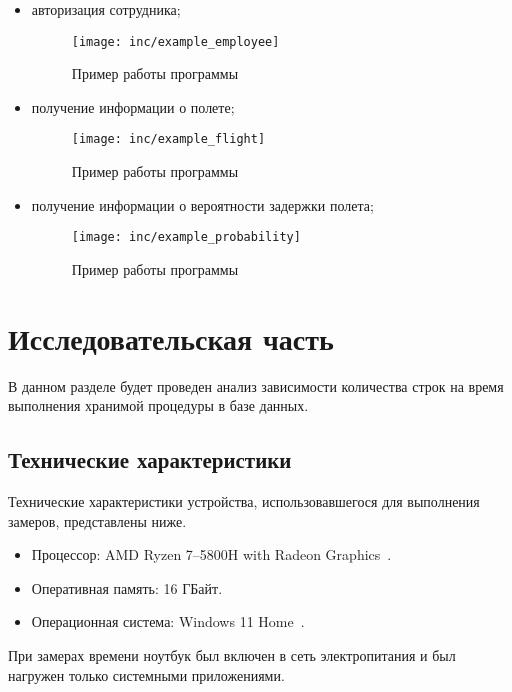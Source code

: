\begin{itemize}
    \item авторизация сотрудника;
    \begin{figure}[H]
        \centering
        \texttt{[image: inc/example\_employee]}
        \caption{Пример работы программы}
        \label{fig:example_employee}
    \end{figure}

    \item получение информации о полете;
    \begin{figure}[H]
        \centering
        \texttt{[image: inc/example\_flight]}
        \caption{Пример работы программы}
        \label{fig:example_flight}
    \end{figure}

    \item получение информации о вероятности задержки полета;
    \begin{figure}[H]
        \centering
        \texttt{[image: inc/example\_probability]}
        \caption{Пример работы программы}
        \label{fig:example_probability}
    \end{figure}
\end{itemize}


\chapter{Исследовательская часть}

В данном разделе будет проведен анализ зависимости количества строк на время выполнения хранимой процедуры в базе данных.

\section{Технические характеристики}

Технические характеристики устройства, использовавшегося для выполнения замеров, представлены ниже.

\begin{itemize}[label=---]
    \item Процессор: AMD Ryzen 7--5800H with Radeon Graphics~\cite{amd_ryzen}.
    \item Оперативная память: 16 ГБайт.
    \item Операционная система: Windows 11 Home~\cite{windows}.
\end{itemize}

При замерах времени ноутбук был включен в сеть электропитания и был нагружен только системными приложениями.

